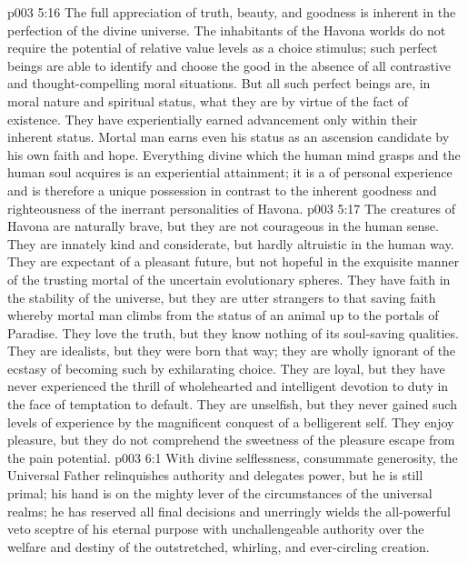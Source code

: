 \vs p003 5:16 \pc The full appreciation of truth, beauty, and goodness is inherent in the perfection of the divine universe. The inhabitants of the Havona worlds do not require the potential of relative value levels as a choice stimulus; such perfect beings are able to identify and choose the good in the absence of all contrastive and thought\hyp{}compelling moral situations. But all such perfect beings are, in moral nature and spiritual status, what they are by virtue of the fact of existence. They have experientially earned advancement only within their inherent status. Mortal man earns even his status as an ascension candidate by his own faith and hope. Everything divine which the human mind grasps and the human soul acquires is an experiential attainment; it is a  of personal experience and is therefore a unique possession in contrast to the inherent goodness and righteousness of the inerrant personalities of Havona.
\vs p003 5:17 \pc The creatures of Havona are naturally brave, but they are not courageous in the human sense. They are innately kind and considerate, but hardly altruistic in the human way. They are expectant of a pleasant future, but not hopeful in the exquisite manner of the trusting mortal of the uncertain evolutionary spheres. They have faith in the stability of the universe, but they are utter strangers to that saving faith whereby mortal man climbs from the status of an animal up to the portals of Paradise. They love the truth, but they know nothing of its soul\hyp{}saving qualities. They are idealists, but they were born that way; they are wholly ignorant of the ecstasy of becoming such by exhilarating choice. They are loyal, but they have never experienced the thrill of wholehearted and intelligent devotion to duty in the face of temptation to default. They are unselfish, but they never gained such levels of experience by the magnificent conquest of a belligerent self. They enjoy pleasure, but they do not comprehend the sweetness of the pleasure escape from the pain potential.
\vs p003 6:1 With divine selflessness, consummate generosity, the Universal Father relinquishes authority and delegates power, but he is still primal; his hand is on the mighty lever of the circumstances of the universal realms; he has reserved all final decisions and unerringly wields the all\hyp{}powerful veto sceptre of his eternal purpose with unchallengeable authority over the welfare and destiny of the outstretched, whirling, and ever\hyp{}circling creation.
